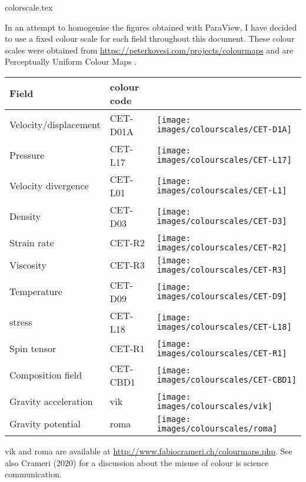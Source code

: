 \begin{flushright} {\tiny {\color{gray} colorscale.tex}} \end{flushright}

In an attempt to homogenise the figures obtained with ParaView, I have decided to use 
a fixed colour scale for each field throughout this document. These colour scales were 
obtained from \url{https://peterkovesi.com/projects/colourmaps} and are 
Perceptually Uniform Colour Maps \cite{kove15}. 

\begin{center}
\begin{tabular}{lll}
\hline
Field & colour code & \\
\hline\hline
Velocity/displacement & CET-D01A & \texttt{[image: images/colourscales/CET-D1A]}\\
\hline
Pressure& CET-L17 & \texttt{[image: images/colourscales/CET-L17]}\\
\hline
Velocity divergence& CET-L01 & \texttt{[image: images/colourscales/CET-L1]}\\
\hline
Density& CET-D03 & \texttt{[image: images/colourscales/CET-D3]}\\
\hline
Strain rate& CET-R2 & \texttt{[image: images/colourscales/CET-R2]}\\
\hline
Viscosity & CET-R3 & \texttt{[image: images/colourscales/CET-R3]}\\
\hline
Temperature & CET-D09 & \texttt{[image: images/colourscales/CET-D9]}\\
\hline
stress & CET-L18 &  \texttt{[image: images/colourscales/CET-L18]}\\
\hline
Spin tensor & CET-R1 &  \texttt{[image: images/colourscales/CET-R1]}\\
\hline
Composition field & CET-CBD1 & \texttt{[image: images/colourscales/CET-CBD1]}\\
\hline
Gravity acceleration & vik &  \texttt{[image: images/colourscales/vik]}\\
\hline
Gravity potential & roma &  \texttt{[image: images/colourscales/roma]}\\
\hline
\end{tabular}
\end{center}

vik and roma are available at \url{http://www.fabiocrameri.ch/colourmaps.php}.
See also Crameri \etal (2020) for a discussion about the misuse of 
colour is science communication.






